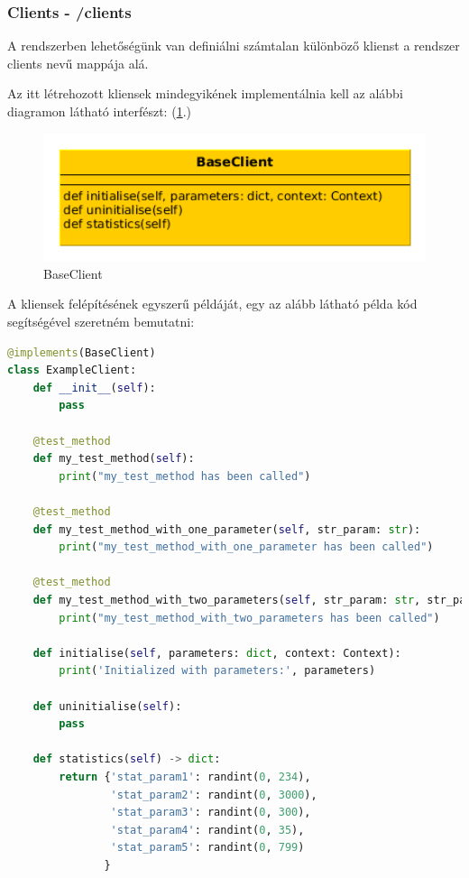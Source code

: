 \documentclass[a4paper,12pt,oneside]{report}
\begin{document}
\subsubsection{Clients - /clients}

A rendszerben lehetőségünk van definiálni számtalan különböző klienst a rendszer clients nevű mappája alá.

Az itt létrehozott kliensek mindegyikének implementálnia kell az alábbi diagramon látható interfészt: (\ref{fig:baseclient}.)

\begin{figure}[h]
  \includegraphics[width=13cm, keepaspectratio]{baseclient.png}
  \caption{BaseClient}
  \label{fig:baseclient}
\end{figure}

A kliensek felépítésének egyszerű példáját, egy az alább látható példa kód segítségével szeretném bemutatni:


\begin{lstlisting}[language=Python]
@implements(BaseClient)
class ExampleClient:
    def __init__(self):
        pass

    @test_method
    def my_test_method(self):
        print("my_test_method has been called")

    @test_method
    def my_test_method_with_one_parameter(self, str_param: str):
        print("my_test_method_with_one_parameter has been called")

    @test_method
    def my_test_method_with_two_parameters(self, str_param: str, str_param2: str):
        print("my_test_method_with_two_parameters has been called")

    def initialise(self, parameters: dict, context: Context):
        print('Initialized with parameters:', parameters)

    def uninitialise(self):
        pass

    def statistics(self) -> dict:
        return {'stat_param1': randint(0, 234),
                'stat_param2': randint(0, 3000),
                'stat_param3': randint(0, 300),
                'stat_param4': randint(0, 35),
                'stat_param5': randint(0, 799)
               }
\end{lstlisting}
\end{document}
